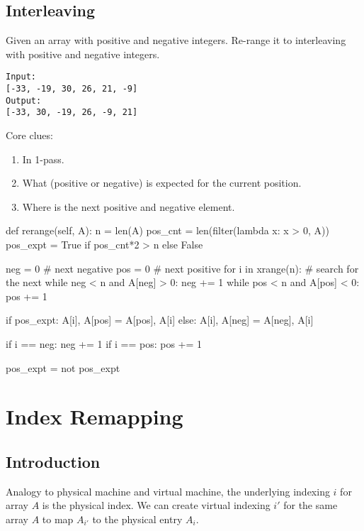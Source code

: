 \subsection{Interleaving}
 Given an array with positive and negative integers. Re-range it to interleaving with positive and negative integers.
\begin{lstlisting}
Input:
[-33, -19, 30, 26, 21, -9]
Output:
[-33, 30, -19, 26, -9, 21]
\end{lstlisting}
Core clues:
\begin{enumerate}
\item In 1-pass.
\item What (positive or negative) is expected for the current position.
\item Where is the next positive and negative element.
\end{enumerate}
\begin{python}
def rerange(self, A):
    n = len(A)
    pos_cnt = len(filter(lambda x: x > 0, A))
    pos_expt = True if pos_cnt*2 > n else False

    neg = 0  # next negative
    pos = 0  # next positive
    for i in xrange(n):
        # search for the next 
        while neg < n and A[neg] > 0: neg += 1
        while pos < n and A[pos] < 0: pos += 1
        
        if pos_expt:
            A[i], A[pos] = A[pos], A[i]
        else:
            A[i], A[neg] = A[neg], A[i]

        if i == neg: neg += 1
        if i == pos: pos += 1

        pos_expt = not pos_expt
\end{python}

\section{Index Remapping}
\subsection{Introduction}
 Analogy to physical machine and virtual machine, the underlying indexing $i$ for array $A$ is the physical index. We can create virtual indexing $i'$ for the same array $A$ to map $A_{i'}$ to the physical entry $A_{i}$.
